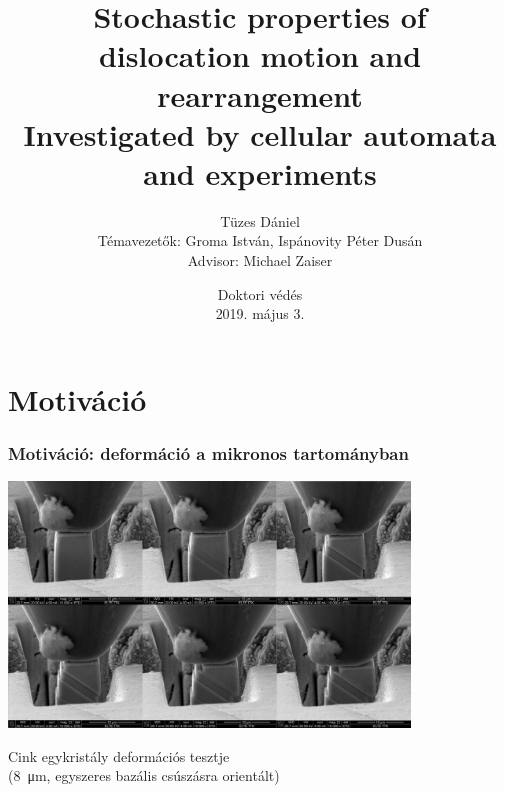 \documentclass[12pt]{beamer}
\title[Doktori téma]{Stochastic properties of\\dislocation motion and rearrangement\\{\small Investigated by cellular automata and experiments}}
\author[Tüzes]{Tüzes Dániel\\\vspace{1em}Témavezetők: Groma István, Ispánovity Péter Dusán\\Advisor: Michael Zaiser}
\institute[ELTE Fizika Doktori Iskola] %
{
  Anyagtudomány és szilárdtestfizika, Fizika Doktori Iskola, ELTE TTK
}
\date{Doktori védés\\2019. május 3.}
\begin{document}
 
\frame[plain]{\titlepage}
 
 
\section{Motiváció}
\begin{frame}
\frametitle{Motiváció: deformáció a mikronos tartományban}
\begin{center}
\includegraphics[width=0.8\textwidth]{figs/bazalisZn28840.png} 
\end{center}
Cink egykristály deformációs tesztje\\(\SI{8}{\micro\meter}, egyszeres bazális csúszásra orientált)
\end{frame}
\end{document}
